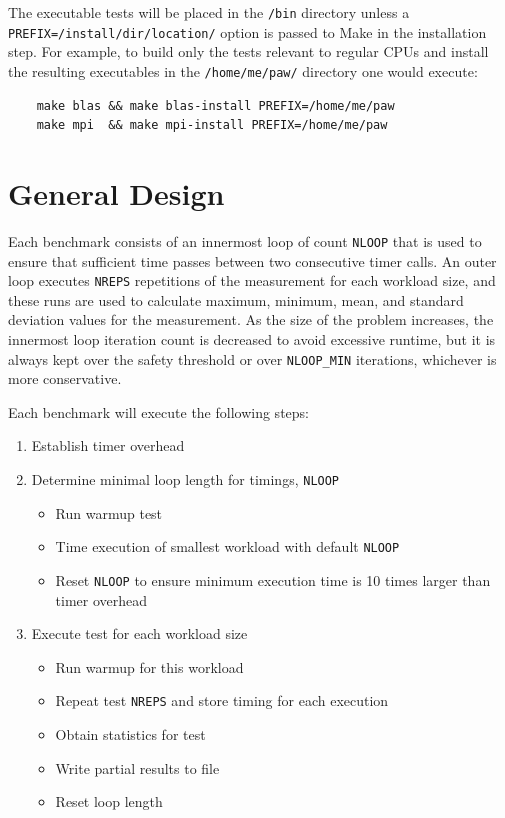 \documentclass[10pt,a4paper]{report}
\begin{document}
The executable tests will be placed in the \verb+/bin+ directory unless a \verb+PREFIX=/install/dir/location/+ option is passed to Make in the installation step. For example, to build only the tests relevant to regular CPUs and install the resulting executables in the \verb+/home/me/paw/+ directory one would execute:

\begin{verbatim}
    make blas && make blas-install PREFIX=/home/me/paw
    make mpi  && make mpi-install PREFIX=/home/me/paw
\end{verbatim}

\FloatBarrier
\chapter{General Design}
Each benchmark consists of an innermost loop of count \verb+NLOOP+ that is used to ensure that sufficient time passes between two consecutive timer calls. An outer loop executes \verb+NREPS+ repetitions of the measurement for each workload size, and these runs are used to calculate maximum, minimum, mean, and standard deviation values for the measurement. As the size of the problem increases, the innermost loop iteration count is decreased to avoid excessive runtime, but it is always kept over the safety threshold or over \verb+NLOOP_MIN+ iterations, whichever is more conservative.

Each benchmark will execute the following steps:

\begin{enumerate}
\item Establish timer overhead
\item Determine minimal loop length for timings, \verb+NLOOP+
\begin{itemize}
	\item Run warmup test
	\item Time execution of smallest workload with default \verb+NLOOP+
	\item Reset \verb+NLOOP+ to ensure minimum execution time is 10 times larger than timer overhead
\end{itemize}
\item Execute test for each workload size
\begin{itemize}
	\item Run warmup for this workload
	\item Repeat test \verb+NREPS+ and store timing for each execution
	\item Obtain statistics for test
	\item Write partial results to file
	\item Reset loop length
\end{itemize}

\end{enumerate}
\end{document}
